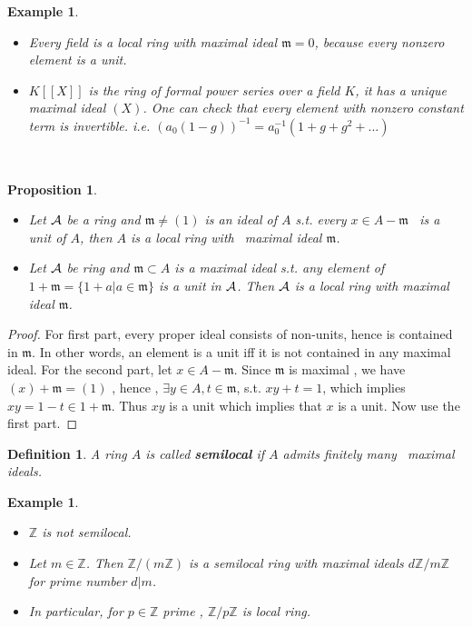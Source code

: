 \documentclass[11pt]{article}
\newtheorem{prop}[thm]{Proposition}
\newtheorem{dfn}[thm]{Definition}
\newtheorem{ex}[thm]{Example}
\newcommand{\intg}{\mathbb Z}
\newcommand{\scm}{{\mathfrak m}}
\newcommand{\cala}{{\cal A}}
\begin{document}
\begin{ex}
\ 
\begin{itemize}
\item
Every field is a local ring with maximal ideal $\scm=0$, because every nonzero element is a unit.
\item
$K[[X]]$ is the ring of formal power series over a field $K$, it has a unique maximal ideal $(X)$. One can check that every element with nonzero constant term is invertible. i.e. $(a_0(1-g))^{-1}=a_0^{-1}(1+g+g^2+...)$
\end{itemize}
\end{ex}
 
\begin{prop}\ 
\begin{itemize}
\item 
Let $\cala$ be a ring and $\scm\neq (1)$ is an ideal of $A$ s.t. every $x\in A-\scm$  is a unit of $A$, then $A$ is a local ring with  maximal ideal $\scm$.
\item
Let $\cala$ be ring and $\scm\subset A$ is a maximal ideal s.t. any element of $1+\scm=\{1+a|a\in \scm \}$ is a unit in $\cala$. Then $\cala$ is a local ring with maximal ideal $\scm$.
\end{itemize}
\end{prop}

\begin{proof}
For first part, every proper ideal consists of non-units, hence is contained in $\scm$. In other words, an element is a unit iff it is not contained in any maximal ideal.
For the second part, let $x\in A-\scm$. Since $\scm$ is maximal , we have $(x)+\scm=(1)$ , hence , $\exists y\in A, t\in \scm$, s.t. $xy+t=1$, which implies $xy=1-t\in 1+\scm.$ Thus $xy$ is a unit which implies that $x$ is a unit. Now use the first part.
\end{proof}

\begin{dfn}
A ring $A$ is called \textbf{semilocal} if $A$ admits finitely many  maximal ideals.
\end{dfn}

\begin{ex}\ 
\begin{itemize}
\item 
$\intg$ is not semilocal.
\item
Let $m\in \intg$. Then $\intg/(m\intg)$ is a semilocal ring with maximal ideals $ d\intg/m\intg$ for prime number $d|m$.
\item In particular, for $p\in \intg$ prime , $\intg/p \intg$ is local ring.
\end{itemize}
\end{ex}
\end{document}
